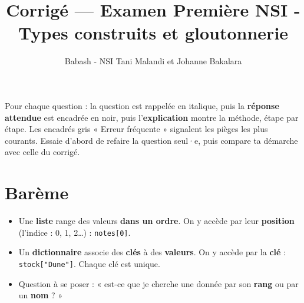 \documentclass[addpoints, 11pt]{exam}
\title{Corrigé --- Examen Première NSI - Types construits et gloutonnerie}
\author{Babash - NSI Tani Malandi et Johanne Bakalara}
\date{}
\newcommand{\code}[1]{\texttt{#1}}
\DeclareRobustCommand{\_}{\textunderscore\allowbreak}
\begin{document}
\pagestyle{headandfoot}
\firstpageheader{}{}{}

\maketitle
\thispagestyle{headandfoot}

\begin{astuce}
Pour chaque question : la question est rappelée en italique, puis la \textbf{réponse attendue} est encadrée en noir, puis l'\textbf{explication} montre la méthode, étape par étape.
Les encadrés gris « Erreur fréquente » signalent les pièges les plus courants. Essaie d'abord de refaire la question seul·e, puis compare ta démarche avec celle du corrigé.
\end{astuce}

\section*{Barème}
\begin{center}
  \gradetable[h]
\end{center}

\begin{astuce}
\begin{itemize}
  \item Une \textbf{liste} range des valeurs \textbf{dans un ordre}. On y accède par leur \textbf{position} (l'indice : 0, 1, 2\dots) : \code{notes[0]}.
  \item Un \textbf{dictionnaire} associe des \textbf{clés} à des \textbf{valeurs}. On y accède par la \textbf{clé} : \code{stock["Dune"]}. Chaque clé est unique.
  \item Question à se poser : « est-ce que je cherche une donnée par son \textbf{rang} ou par un \textbf{nom} ? »
\end{itemize}
\end{astuce}
\end{document}
